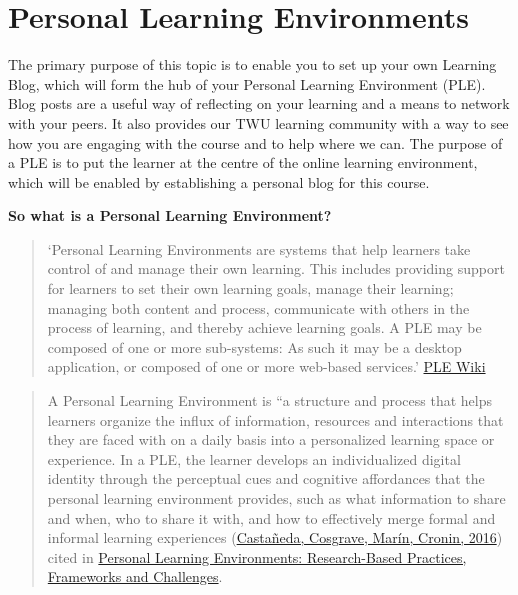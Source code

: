 \documentclass[
]{book}
\theoremstyle{definition}
\theoremstyle{definition}
\theoremstyle{definition}
\theoremstyle{definition}
\theoremstyle{remark}
\begin{document}
\hypertarget{personal-learning-environments}{%
\section{Personal Learning Environments}\label{personal-learning-environments}}

The primary purpose of this topic is to enable you to set up your own Learning Blog, which will form the hub of your Personal Learning Environment (PLE). Blog posts are a useful way of reflecting on your learning and a means to network with your peers. It also provides our TWU learning community with a way to see how you are engaging with the course and to help where we can. The purpose of a PLE is to put the learner at the centre of the online learning environment, which will be enabled by establishing a personal blog for this course.

\textbf{So what is a Personal Learning Environment?}

\begin{quote}
`Personal Learning Environments are systems that help learners take control of and manage their own learning. This includes providing support for learners to set their own learning goals, manage their learning; managing both content and process, communicate with others in the process of learning, and thereby achieve learning goals. A PLE may be composed of one or more sub-systems: As such it may be a desktop application, or composed of one or more web-based services.' \href{https://edutechwiki.unige.ch/en/Personal_learning_environment}{PLE Wiki}
\end{quote}

\begin{quote}
A Personal Learning Environment is ``a structure and process that helps learners organize the influx of information, resources and interactions that they are faced with on a daily basis into a personalized learning space or experience. In a PLE, the learner develops an individualized digital identity through the perceptual cues and cognitive affordances that the personal learning environment provides, such as what information to share and when, who to share it with, and how to effectively merge formal and informal learning experiences (\href{https://naerjournal.ua.es/article/view/v6n1-introduction\#}{Castañeda, Cosgrave, Marín, Cronin, 2016}) cited in \href{https://naerjournal.ua.es/article/view/v6n1-introduction}{Personal Learning Environments: Research-Based Practices, Frameworks and Challenges}.
\end{quote}
\end{document}
